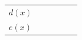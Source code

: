 {\begin{tabular}[t]{|l|l|l|l|l|l|}
     \tabularnewline\cline{1-1}\cline{2-2}\cline{3-3}\cline{4-4}\cline{5-5}\cline{6-6}
                  $d\left(x\right)$
                 &
         &
         &
         &
         &
     \tabularnewline\cline{1-1}\cline{2-2}\cline{3-3}\cline{4-4}\cline{5-5}\cline{6-6}
                  $e\left(x\right)$
                 &
         &
         &
         &

\end{tabular}}

